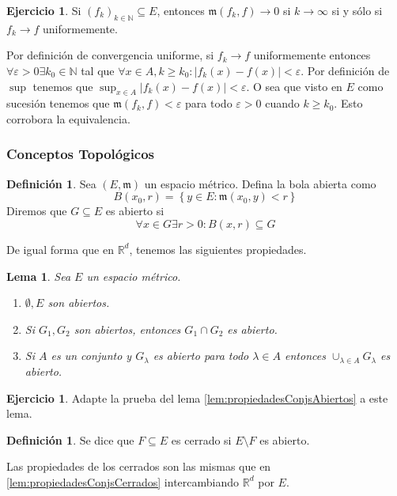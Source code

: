 \documentclass[12pt]{article}
\theoremstyle{plain}
\newtheorem{Lem}[Th]{Lema}             %
\theoremstyle{definition}
\newtheorem{Def}[Th]{Definición}       %
\newtheorem{Ej}[Th]{Ejercicio}
\theoremstyle{remark}
\numberwithin{equation}{section}
\newcommand{\bN}{\mathbb{N}}        %
\newcommand{\bR}{\mathbb{R}}        %
\newcommand{\mm}{\mathfrak{m}}      %
\renewcommand{\geq}{\geqslant}      %
\renewcommand{\:}{\colon}           %
\newcommand{\conj}[1]{\left\lbrace#1\right\rbrace}
\begin{document}
\begin{multicols}{2}
\begin{Ej}
  Si $(f_k)_{k\in\bN}\subseteq E$, entonces $\mm(f_k,f)\to 0$ si $k\to\infty$ si y sólo si $f_k\to f$ uniformemente.
 \end{Ej}
\begin{ptcb}
 Por definición de convergencia uniforme, si $f_k\to f$ uniformemente entonces $\forall\varepsilon >0\exists k_0\in\bN$ tal que $\forall x\in A, k\geq k_0\colon |f_k(x)-f(x)|<\varepsilon$. Por definición de $\sup$ tenemos que $\sup_{x\in A}|f_k(x)-f(x)|<\varepsilon$. O sea que visto en $E$ como sucesión tenemos que $\mm(f_k,f)<\varepsilon$ para todo $\varepsilon>0$ cuando $k\geq k_0$. Esto corrobora la equivalencia.

\end{ptcb}
\subsubsection*{Conceptos Topológicos}

\begin{Def}
  Sea $(E,\mm)$ un espacio métrico. Defina la bola abierta como
  $$B(x_0,r)=\conj{y\in E\colon\mm(x_0,y)<r}$$
  Diremos que $G\subseteq E$ es abierto si $$\forall x\in G\exists r>0\colon B(x,r)\subseteq G$$
\end{Def}

De igual forma que en $\bR^d$, tenemos las siguientes propiedades.

\begin{Lem}
Sea $E$ un espacio métrico.
  \begin{enumerate}
    \item $\emptyset, E$ son abiertos.
    \item Si $G_1, G_2$ son abiertos, entonces $G_1\cap G_2$ es abierto.
    \item Si $A$ es un conjunto y $G_\lambda$ es abierto para todo $\lambda\in A$ entonces $\cup_{\lambda\in A}G_\lambda$ es abierto.
  \end{enumerate}
\end{Lem}

\begin{Ej}
  Adapte la prueba del lema \ref{lem:propiedadesConjsAbiertos} a este lema.
\end{Ej}

\begin{Def}
  Se dice que $F\subseteq E$ es cerrado si $E\setminus F$ es abierto.
\end{Def}

Las propiedades de los cerrados son las mismas que en \ref{lem:propiedadesConjsCerrados} intercambiando $\bR^d$ por $E$.


\end{multicols}
\end{document}
